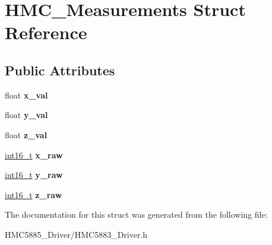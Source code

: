 \hypertarget{structHMC__Measurements}{}\section{H\+M\+C\+\_\+\+Measurements Struct Reference}
\label{structHMC__Measurements}
\subsection*{Public Attributes}
\begin{DoxyCompactItemize}
\item 
\mbox{\label{structHMC__Measurements_abe88eba894640198dd401ebe064c38e4}} 
float {\bfseries x\+\_\+val}
\item 
\mbox{\label{structHMC__Measurements_a88015d635030cd43d90c8dd0a9f0cf4a}} 
float {\bfseries y\+\_\+val}
\item 
\mbox{\label{structHMC__Measurements_a61ac0b342141e6a8cc2040171c2da7af}} 
float {\bfseries z\+\_\+val}
\item 
\mbox{\label{structHMC__Measurements_a67f7afa8023b866bd67789e08b8f6c7a}} 
\hyperlink{vl53l0x__types_8h_aa343fa3b3d06292b959ffdd4c4703b06}{int16\+\_\+t} {\bfseries x\+\_\+raw}
\item 
\mbox{\label{structHMC__Measurements_ace80e715ae898ef5110f482a645652cf}} 
\hyperlink{vl53l0x__types_8h_aa343fa3b3d06292b959ffdd4c4703b06}{int16\+\_\+t} {\bfseries y\+\_\+raw}
\item 
\mbox{\label{structHMC__Measurements_a60511e3ca5bb79554f3f433e358e1dc1}} 
\hyperlink{vl53l0x__types_8h_aa343fa3b3d06292b959ffdd4c4703b06}{int16\+\_\+t} {\bfseries z\+\_\+raw}
\end{DoxyCompactItemize}


The documentation for this struct was generated from the following file\+:\begin{DoxyCompactItemize}
\item 
H\+M\+C5885\+\_\+\+Driver/H\+M\+C5883\+\_\+\+Driver.\+h\end{DoxyCompactItemize}
